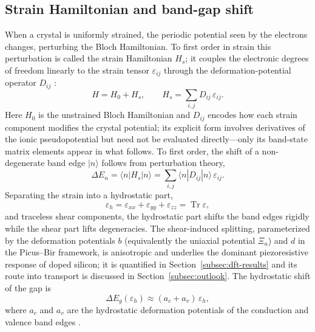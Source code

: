 \subsection{Strain Hamiltonian and band-gap shift}
\label{subsec:strain-hamiltonian}

When a crystal is uniformly strained, the periodic potential seen by the
electrons changes, perturbing the Bloch Hamiltonian. To first order in strain
this perturbation is called the strain Hamiltonian $H_s$; it couples the
electronic degrees of freedom linearly to the strain tensor $\varepsilon_{ij}$
through the deformation-potential operator $D_{ij}$ \cite{hamaguchi}:
\begin{equation}
  H = H_0 + H_s, \qquad H_s = \sum_{i,j} D_{ij}\,\varepsilon_{ij}.
  \label{eq:Hs}
\end{equation}
Here $H_0$ is the unstrained Bloch Hamiltonian and $D_{ij}$ encodes how each
strain component modifies the crystal potential; its explicit form involves
derivatives of the ionic pseudopotential but need not be evaluated
directly---only its band-state matrix elements appear in what follows.
To first order, the shift of a non-degenerate band edge $|n\rangle$ follows
from perturbation theory,
\begin{equation}
  \Delta E_n = \langle n|H_s|n\rangle
             = \sum_{i,j}\langle n|D_{ij}|n\rangle\,\varepsilon_{ij}.
  \label{eq:dEn}
\end{equation}
Separating the strain into a hydrostatic part,
\begin{equation}
  \varepsilon_h = \varepsilon_{xx}+\varepsilon_{yy}+\varepsilon_{zz} = \operatorname{Tr}\varepsilon,
  \label{eq:eps-h}
\end{equation}
and traceless shear components, the hydrostatic part shifts the band edges
rigidly while the shear part lifts degeneracies. The shear-induced splitting,
parameterized by the deformation potentials $b$ (equivalently the uniaxial
potential $\Xi_u$) and $d$ in the Picus--Bir framework, is anisotropic and
underlies the dominant piezoresistive response of doped silicon; it is
quantified in Section~\ref{subsec:dft-results} and its route into transport is
discussed in Section~\ref{subsec:outlook}. The hydrostatic shift of the gap is
\begin{equation}
  \Delta E_g(\varepsilon_h) \approx (a_c+a_v)\,\varepsilon_h,
  \label{eq:gap-shift}
\end{equation}
where $a_c$ and $a_v$ are the hydrostatic deformation potentials of the
conduction and valence band edges \cite{hamaguchi}.

